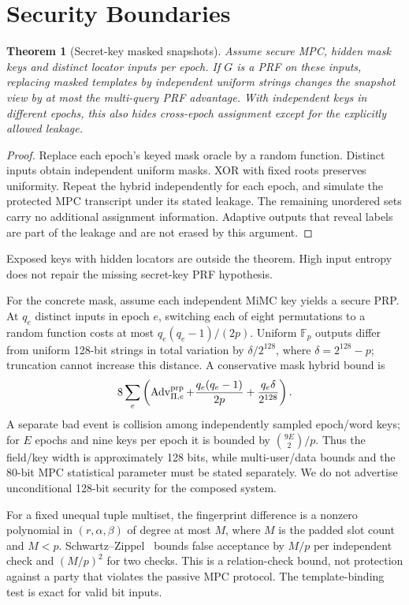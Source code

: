 \documentclass[journal]{IEEEtran}
\newcommand{\Adv}{\operatorname{Adv}}
\newtheorem{theorem}{Theorem}
\begin{document}
\section{Security Boundaries}
\begin{theorem}[Secret-key masked snapshots]
Assume secure MPC, hidden mask keys and distinct locator inputs per epoch. If $G$ is a PRF on these inputs, replacing masked templates by independent uniform strings changes the snapshot view by at most the multi-query PRF advantage. With independent keys in different epochs, this also hides cross-epoch assignment except for the explicitly allowed leakage.
\end{theorem}
\begin{proof}
Replace each epoch's keyed mask oracle by a random function. Distinct inputs obtain independent uniform masks. XOR with fixed roots preserves uniformity. Repeat the hybrid independently for each epoch, and simulate the protected MPC transcript under its stated leakage. The remaining unordered sets carry no additional assignment information. Adaptive outputs that reveal labels are part of the leakage and are not erased by this argument.
\end{proof}
Exposed keys with hidden locators are outside the theorem. High input entropy does not repair the missing secret-key PRF hypothesis.

For the concrete mask, assume each independent MiMC key yields a secure PRP. At $q_e$ distinct inputs in epoch $e$, switching each of eight permutations to a random function costs at most $q_e(q_e-1)/(2p)$. Uniform $\mathbb F_p$ outputs differ from uniform 128-bit strings in total variation by $\delta/2^{128}$, where $\delta=2^{128}-p$; truncation cannot increase this distance. A conservative mask hybrid bound is
\begin{equation}
8\sum_e\left(\Adv_{\Pi,e}^{\rm prp}+\frac{q_e(q_e-1)}{2p}
+\frac{q_e\delta}{2^{128}}\right).
\end{equation}
A separate bad event is collision among independently sampled epoch/word keys; for $E$ epochs and nine keys per epoch it is bounded by $\binom{9E}{2}/p$. Thus the field/key width is approximately 128 bits, while multi-user/data bounds and the 80-bit MPC statistical parameter must be stated separately. We do not advertise unconditional 128-bit security for the composed system.

For a fixed unequal tuple multiset, the fingerprint difference is a nonzero polynomial in $(r,\alpha,\beta)$ of degree at most $M$, where $M$ is the padded slot count and $M<p$. Schwartz--Zippel~\cite{schwartz1980fast} bounds false acceptance by $M/p$ per independent check and $(M/p)^2$ for two checks. This is a relation-check bound, not protection against a party that violates the passive MPC protocol. The template-binding test is exact for valid bit inputs.
\end{document}
